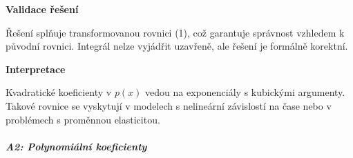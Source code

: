 \begin{example}
    \noindent\textbf{Validace řešení}
    
    Řešení splňuje transformovanou rovnici (1), což garantuje správnost vzhledem k původní rovnici. Integrál nelze vyjádřit uzavřeně, ale řešení je formálně korektní.
    
    \vspace{1.5\baselineskip}
    
    \noindent\textbf{Interpretace}
    
    Kvadratické koeficienty v $p(x)$ vedou na exponenciály s kubickými argumenty. Takové rovnice se vyskytují v modelech s nelineární závislostí na čase nebo v problémech s proměnnou elasticitou.
    
    \end{example}

    \subparagraph*{A2: Polynomiální koeficienty}
\label{subpar:l2-a2-polynomialni-koeficienty-rozsirene}

